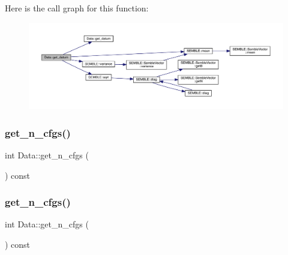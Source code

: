 Here is the call graph for this function\+:
\nopagebreak
\begin{figure}[H]
\begin{center}
\leavevmode
\includegraphics[width=350pt]{d0/df3/classData_aab2d2ba01acb88ede5beb3ab54053d73_cgraph}
\end{center}
\end{figure}
\mbox{\label{classData_a1ac2adcf6c6717759f820eceed4b55e4}} 
\subsubsection{\texorpdfstring{get\_n\_cfgs()}{get\_n\_cfgs()}\hspace{0.1cm}{\footnotesize\ttfamily [1/2]}}
{\footnotesize\ttfamily int Data\+::get\+\_\+n\+\_\+cfgs (\begin{DoxyParamCaption}{ }\end{DoxyParamCaption}) const\hspace{0.3cm}{\ttfamily [inline]}}

\mbox{\label{classData_a1ac2adcf6c6717759f820eceed4b55e4}} 
\subsubsection{\texorpdfstring{get\_n\_cfgs()}{get\_n\_cfgs()}\hspace{0.1cm}{\footnotesize\ttfamily [2/2]}}
{\footnotesize\ttfamily int Data\+::get\+\_\+n\+\_\+cfgs (\begin{DoxyParamCaption}{ }\end{DoxyParamCaption}) const\hspace{0.3cm}{\ttfamily [inline]}}

\mbox{\label{classData_a1ec16adf40ee062d8d75b33acfe156d5}} 
